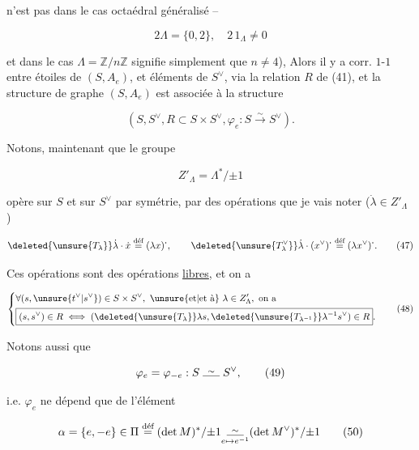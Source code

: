 n'est pas dans le cas octaédral généralisé --

\[
2\Lambda=\{0,2\},\quad 2\,1_\Lambda\ne0 \tag*{(44)}
\]

et dans le cas $\Lambda=\mathbb Z/n\mathbb Z$ signifie simplement que $n\ne4$), Alors il y a corr. $1$-$1$ entre étoiles de $(S,A_e)$, et éléments de $S^\vee$, via la relation $R$ de (41), et la structure de graphe $(S,A_e)$ est associée à la structure

\[
(S,S^\vee,R\subset S\times S^\vee,\varphi_e:S\xrightarrow{\sim}S^\vee). \tag*{(45)}
\]

Notons, maintenant que le groupe

\[
Z'_\Lambda=\Lambda^*/{\pm1} \tag*{(46)}
\]

opère sur $S$ et sur $S^\vee$ par symétrie,  par des opérations que je vais noter   ($\dot\lambda\in Z'_\Lambda$ )

\[
\deleted{\unsure{T_\lambda}}\dot\lambda\cdot\dot x\overset{\text{déf}}=(\lambda x)^{\boldsymbol\cdot},\qquad
\deleted{\unsure{T^\vee_\lambda}}\dot\lambda\cdot(x^\vee)^{\boldsymbol\cdot}\overset{\text{déf}}=(\lambda x^\vee)^{\boldsymbol\cdot}. \tag*{(47)}
\]

Ces  opérations sont des opérations \uline{libres}, et on a

\[
\left\{\begin{aligned}
&\forall(s,\unsure{t^\vee|s^\vee})\in S\times S^\vee,\ \text{\unsure{et|et à} }\lambda\in Z'_\Lambda,\ \text{on a}\\
&\boxed{(s,s^\vee)\in R\iff(\deleted{\unsure{T_\lambda}}\lambda s,\deleted{\unsure{T_{\lambda^{-1}}}}\lambda^{-1}s^\vee)\in R}.
\end{aligned}\right. \tag*{(48)}
\]

Notons aussi que

\[
\varphi_e=\varphi_{-e}:S\mathrel{\overset{\sim}{\rule{1.5em}{0.35pt}}}S^\vee, \tag*{(49)}
\]

 i.e. $\varphi_e$ ne dépend que de l'élément

\[
\alpha=\{e,-e\}\in\Pi\overset{\text{déf}}=(\det M)^*/{\pm1}
\underset{e\mapsto e^{-1}}{\overset{\sim}{\rule{1.5em}{0.35pt}}}(\det M^\vee)^*/{\pm1} \tag*{(50)}
\]


